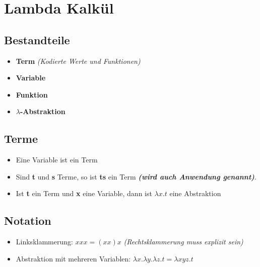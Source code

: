 \section{Lambda Kalkül}

\subsection{Bestandteile}
\begin{itemize}
    \item \textbf{Term} \textit{(Kodierte Werte und Funktionen)}
    \item \textbf{Variable}
    \item \textbf{Funktion}
    \item $\lambda$\textbf{-Abstraktion}
\end{itemize}

\subsection{Terme}
\begin{itemize}
    \item Eine Variable ist ein Term
    \item Sind \textbf{t} und \textbf{s} Terme, so ist \textbf{ts} ein Term
          \textbf{\textit{(wird auch Anwendung genannt)}}.
    \item Ist \textbf{t} ein Term und \textbf{x} eine Variable,
          dann ist $\lambda x.t$ eine Abstraktion
\end{itemize}

\subsection{Notation}
\begin{itemize}
    \item Linksklammerung: $xxx = (xx)x$
          \textit{(Rechtsklammerung muss explizit sein)}
    \item Abstraktion mit mehreren Variablen:
          $\lambda x.\lambda y.\lambda z.t = \lambda xyz.t$
\end{itemize}
